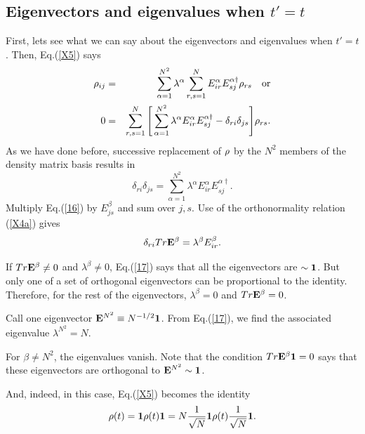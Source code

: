 \documentclass[aps,pra,amssymb, amsfonts,amsmath,showpacs, superscriptaddress,12pt]{revtex4}
\begin{document}
\subsection{Eigenvectors and eigenvalues when $t'=t$}

First, lets see what we can say about the eigenvectors and eigenvalues when $t'=t$.   Then, Eq.(\ref{X5}) says
\begin{eqnarray}\label{15}
\rho_{ij}&=&\sum_{\alpha=1}^{N^{2}}\lambda^{\alpha}\sum_{r,s=1}^{N}E_{ir}^{\alpha}E_{sj}^{\alpha\dagger}\rho_{rs}\quad\hbox{or}\nonumber\\
0&=&\sum_{r,s=1}^{N}\Bigg[\sum_{\alpha=1}^{N^{2}}\lambda^{\alpha}E_{ir}^{\alpha}E_{sj}^{\alpha\dagger}-\delta_{ri}\delta_{js}\Bigg]\rho_{rs}.
\end{eqnarray}
\noindent As we have done before, successive replacement of ${\bf\rho}$ by the  $N^{2}$ members of the density matrix basis results in
\begin{equation}\label{16}
\delta_{ri}\delta_{js}=\sum_{\alpha=1}^{N^{2}}\lambda^{\alpha}E_{ir}^{\alpha}E_{sj}^{\alpha\dagger}.
\end{equation}
\noindent Multiply Eq.(\ref{16}) by $E_{js}^{\beta}$ and sum over $j,s$.  Use of the orthonormality relation (\ref{X4a}) gives 
\begin{equation}\label{17}
\delta_{ri}Tr{\bf E}^{\beta}=\lambda^{\beta}E_{ir}^{\beta}. 
\end{equation}

If $Tr{\bf E}^{\beta}\neq 0$ and $\lambda^{\beta}\neq0$,   Eq.(\ref{17}) says that all the eigenvectors are  $\sim{\bf 1}$.   But only one of a set of orthogonal eigenvectors can be proportional to the identity.  Therefore, for the rest of the eigenvectors,  $\lambda^{\beta}=0$ and $Tr{\bf E}^{\beta}=0$. 

Call one eigenvector ${\bf E}^{N^{2}}\equiv N^{-1/2}{\bf 1}$. From Eq.(\ref{17}), we find the associated eigenvalue $\lambda^{N^{2}}=N$. 

For $\beta\neq N^{2}$, the eigenvalues vanish.  Note that the condition $Tr{\bf E}^{\beta}{\bf 1}=0$ says that these eigenvectors are 
 orthogonal to ${\bf E}^{N^{2}}\sim {\bf 1}$. 
 
 And, indeed, in this case, Eq.(\ref{X5}) becomes the identity
\begin{equation}\label{18}
{\bf\rho}(t)={\bf 1}{\bf\rho}(t){\bf 1}=N\frac{1}{\sqrt{N}}{\bf 1}{\bf\rho}(t)\frac{1}{\sqrt{N}}{\bf 1}.
\end{equation} 
\end{document}
